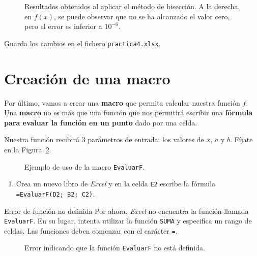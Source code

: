 \documentclass[
  spanish,
  11pt,
  a4paper,
  DIV=11,
  numbers=noendperiod]{scrartcl}
\begin{document}
\begin{figure}[H]
\caption{Resultados obtenidos al aplicar el método de bisección. A la derecha, en \(f(x)\), se puede observar que no se ha alcanzado el valor cero, pero el error es inferior a \(10^{-6}\).}\label{fig-biseccion}
\end{figure}

Guarda los cambios en el fichero \texttt{practica4.xlsx}.

\section{Creación de una macro}
\label{creacion-de-una-macro}

Por último, vamos a crear una \textbf{macro} que permita calcular nuestra función \(f\). Una \textbf{macro} no es más que una función que nos permitirá escribir una \textbf{fórmula para evaluar la función en un punto} dado por una celda.

Nuestra función recibirá 3 parámetros de entrada: los valores de \(x\), \(a\) y \(b\). Fíjate en la Figura~\ref{fig-ejemplo-evaluarf}.

\begin{figure}[H]
\caption{Ejemplo de uso de la macro \texttt{EvaluarF}.}\label{fig-ejemplo-evaluarf}
\end{figure}

\begin{enumerate}
\item Crea un nuevo libro de \emph{Excel} y en la celda \texttt{E2} escribe la fórmula \texttt{=EvaluarF(D2; B2; C2)}.
\end{enumerate}

\begin{PracticeWarningBox}{Error de función no definida}
Por ahora, \emph{Excel} no encuentra la función llamada \texttt{EvaluarF}. En su lugar, intenta utilizar la función \texttt{SUMA} y especifica un rango de celdas. Las funciones deben comenzar con el carácter \texttt{=}.
\end{PracticeWarningBox}

\begin{figure}[H]
\caption{Error indicando que la función \texttt{EvaluarF} no está definida.}\label{fig-error-evaluarf}
\end{figure}
\end{document}
